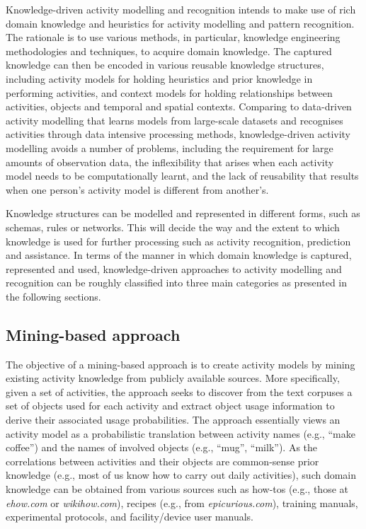 Knowledge-driven activity modelling and recognition intends to make use of rich domain knowledge and heuristics for activity modelling and pattern recognition. The rationale is to use various methods, in particular, knowledge engineering methodologies and techniques, to acquire domain knowledge. The captured knowledge can then be encoded in various reusable knowledge structures, including activity models for holding heuristics and prior knowledge in performing activities, and context models for holding relationships between activities, objects and temporal and spatial contexts. Comparing to data-driven activity modelling that learns models from large-scale datasets and recognises activities through data intensive processing methods, knowledge-driven activity modelling avoids a number of problems, including the requirement for large amounts of observation data, the inflexibility that arises when each activity model needs to be computationally learnt, and the lack of reusability that results when one person’s activity model is different from another’s. 

Knowledge structures can be modelled and represented in different forms, such as schemas, rules or networks. This will decide the way and the extent to which knowledge is used for further processing such as activity recognition, prediction and assistance. In terms of the manner in which domain knowledge is captured, represented and used, knowledge-driven approaches to activity modelling and recognition can be roughly classified into three main categories as presented in the following sections.

\subsection{Mining-based approach}

The objective of a mining-based approach is to create activity models by mining existing activity knowledge from publicly available sources. More specifically, given a set of activities, the approach seeks to discover from the text corpuses a set of objects used for each activity and extract object usage information to derive their associated usage probabilities. The approach essentially views an activity model as a probabilistic translation between activity names (e.g., “make coffee”) and the names of involved objects (e.g., “mug”, “milk”). As the correlations between activities and their objects are common-sense prior knowledge (e.g., most of us know how to carry out daily activities), such domain knowledge can be obtained from various sources such as how-tos (e.g., those at \textit{ehow.com} or \textit{wikihow.com}), recipes (e.g., from \textit{epicurious.com}), training manuals, experimental protocols, and facility/device user manuals.

